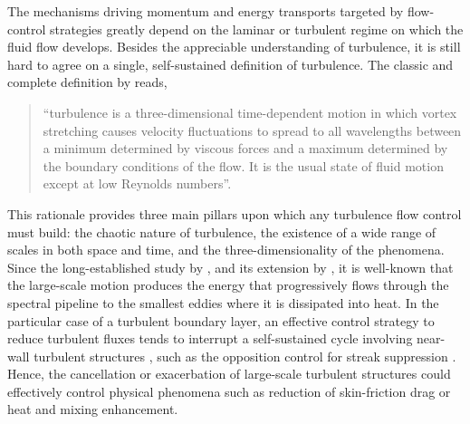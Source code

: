 The mechanisms driving momentum and energy transports targeted by flow-control strategies greatly depend on the laminar or turbulent regime on which the fluid flow develops. Besides the appreciable understanding of turbulence, it is still hard to agree on a single, self-sustained definition of turbulence. The classic and complete definition by \citet{Bradshaw1971turbulence} reads,
%
\begin{quote}
    “turbulence is a three-dimensional time-dependent motion in which vortex stretching causes velocity fluctuations to spread to all wavelengths between a minimum determined by viscous forces and a maximum determined by the boundary conditions of the flow. It is the usual state of fluid motion except at low Reynolds numbers”.
\end{quote}
%
This rationale provides three main pillars upon which any turbulence flow control must build: the chaotic nature of turbulence, the existence of a wide range of scales in both space and time, and the three-dimensionality of the phenomena. Since the long-established study by \citet{Richardson1920}, and its extension by \citet{Kolmogorov1941}, it is well-known that the large-scale motion produces the energy that progressively flows through the spectral pipeline to the smallest eddies where it is dissipated into heat. In the particular case of a turbulent boundary layer, an effective control strategy to reduce turbulent fluxes tends to interrupt a self-sustained cycle involving near-wall turbulent structures \citep{hamilton1995,Jimenez1999, schoppa2002}, such as the opposition control for streak suppression \citep{Choi1994}. Hence, the cancellation or exacerbation of large-scale turbulent structures could effectively control physical phenomena such as reduction of skin-friction drag or heat and mixing enhancement.


